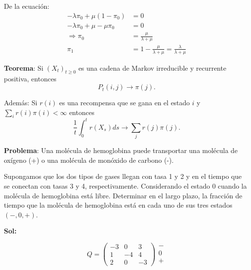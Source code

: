 \documentclass[12pt,a4paper]{article}
\newcommand{\teorema}[1]{%
\begin{teoremabox}
\textbf{Teorema}: #1
\end{teoremabox}
}
\begin{document}
De la ecuación:
\begin{align*}
-\lambda \pi_0 + \mu(1-\pi_0) &= 0 \\
-\lambda \pi_0 + \mu - \mu\pi_0 &= 0 \\
\Rightarrow \pi_0 &= \frac{\mu}{\lambda + \mu} \\
\pi_1 &= 1 - \frac{\mu}{\lambda + \mu} = \frac{\lambda}{\lambda + \mu}
\end{align*}

\teorema{Si $(X_t)_{t \geq 0}$ es una cadena de Markov irreducible y recurrente positiva, entonces
\begin{equation*}
P_t(i,j) \to \pi(j).
\end{equation*}

Además: Si $r(i)$ es una recompensa que se gana en el estado $i$ y $\sum_i r(i) \pi(i) < \infty$ entonces
\begin{equation*}
\frac{1}{t} \int_0^t r(X_s) ds \to \sum_j r(j) \pi(j).
\end{equation*}}


\textbf{Problema}: Una molécula de hemoglobina puede transportar una molécula de oxígeno (+) o una molécula de monóxido de carbono (-).

Supongamos que los dos tipos de gases llegan con tasa 1 y 2 y en el tiempo que se conectan con tasas 3 y 4, respectivamente. Considerando el estado 0 cuando la molécula de hemoglobina está libre. Determinar en el largo plazo, la fracción de tiempo que la molécula de hemoglobina está en cada uno de sus tres estados $(-, 0, +)$.

\textbf{Sol:}

\begin{center}
\end{center}

\begin{equation*}
Q = \begin{pmatrix}
-3 & 0 & 3 \\
1 & -4 & 4 \\
2 & 0 & -3
\end{pmatrix}
\begin{matrix}
- \\
0 \\
+
\end{matrix}
\end{equation*}
\end{document}
